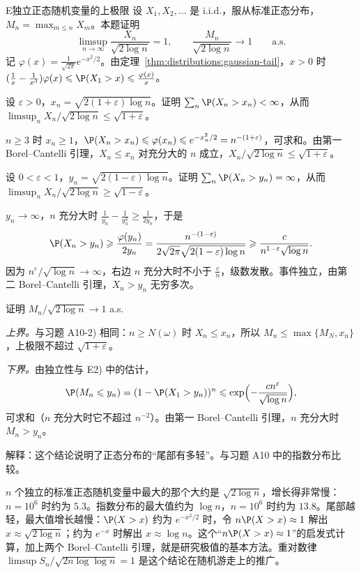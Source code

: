 \begin{probleme}{E}{独立正态随机变量的上极限}
设 $X_1,X_2,\dots$ 是 i.i.d.，服从标准正态分布，$M_n=\max_{m\leqslant n}X_m$。本题证明
\[
\limsup_{n\to\infty}\frac{X_n}{\sqrt{2\log n}}=1,\qquad\frac{M_n}{\sqrt{2\log n}}\to1\qquad\text{a.s.}
\]
记 $\varphi(x)=\frac1{\sqrt{2\pi}}e^{-x^2/2}$。由定理~\ref{thm:distributions:gaussian-tail}，$x>0$ 时 $(\frac1x-\frac1{x^3})\varphi(x)\leqslant \P(X_1>x)\leqslant\frac{\varphi(x)}x$。
\begin{questions}
\item 设 $\varepsilon>0$，$x_n=\sqrt{2(1+\varepsilon)\log n}$。证明 $\sum_n\P(X_n>x_n)<\infty$，从而 $\limsup_nX_n/\sqrt{2\log n}\leqslant\sqrt{1+\varepsilon}$。
\begin{solution}
$n\geqslant3$ 时 $x_n\geqslant1$，$\P(X_n>x_n)\leqslant\varphi(x_n)\leqslant e^{-x_n^2/2}=n^{-(1+\varepsilon)}$，可求和。由第一 Borel--Cantelli 引理，$X_n\leqslant x_n$ 对充分大的 $n$ 成立，$X_n/\sqrt{2\log n}\leqslant\sqrt{1+\varepsilon}$。
\end{solution}
\item 设 $0<\varepsilon<1$，$y_n=\sqrt{2(1-\varepsilon)\log n}$。证明 $\sum_n\P(X_n>y_n)=\infty$，从而 $\limsup_nX_n/\sqrt{2\log n}\geqslant\sqrt{1-\varepsilon}$。
\begin{solution}
$y_n\to\infty$，$n$ 充分大时 $\frac1{y_n}-\frac1{y_n^3}\geqslant\frac1{2y_n}$，于是
\[
\P(X_n>y_n)\geqslant\frac{\varphi(y_n)}{2y_n}=\frac{n^{-(1-\varepsilon)}}{2\sqrt{2\pi}\sqrt{2(1-\varepsilon)\log n}}\geqslant\frac{c}{n^{1-\varepsilon}\sqrt{\log n}} .
\]
因为 $n^{\varepsilon}/\sqrt{\log n}\to\infty$，右边 $n$ 充分大时不小于 $\frac cn$，级数发散。事件独立，由第二 Borel--Cantelli 引理，$X_n>y_n$ 无穷多次。
\end{solution}
\item 证明 $M_n/\sqrt{2\log n}\to1$ a.s.
\begin{solution}
\emph{上界。}与习题 A10-2) 相同：$n\geqslant N(\omega)$ 时 $X_n\leqslant x_n$，所以 $M_n\leqslant\max\{M_N,x_n\}$，上极限不超过 $\sqrt{1+\varepsilon}$。

\emph{下界。}由独立性与 E2) 中的估计，
\[
\P(M_n\leqslant y_n)=(1-\P(X_1>y_n))^n\leqslant\exp\Bigl(-\frac{cn^\varepsilon}{\sqrt{\log n}}\Bigr),
\]
可求和（$n$ 充分大时它不超过 $n^{-2}$）。由第一 Borel--Cantelli 引理，$n$ 充分大时 $M_n>y_n$。
\end{solution}
\item 解释：这个结论说明了正态分布的“尾部有多轻”。与习题 A10 中的指数分布比较。
\begin{solution}
$n$ 个独立的标准正态随机变量中最大的那个大约是 $\sqrt{2\log n}$，增长得非常慢：$n=10^6$ 时约为 $5.3$。指数分布的最大值约为 $\log n$，$n=10^6$ 时约为 $13.8$。尾部越轻，最大值增长越慢：$\P(X>x)$ 约为 $e^{-x^2/2}$ 时，令 $n\P(X>x)\approx1$ 解出 $x\approx\sqrt{2\log n}$；约为 $e^{-x}$ 时解出 $x\approx\log n$。这个“$n\P(X>x)\approx1$”的启发式计算，加上两个 Borel--Cantelli 引理，就是研究极值的基本方法。重对数律 $\limsup S_n/\sqrt{2n\log\log n}=1$ 是这个结论在随机游走上的推广。
\end{solution}
\end{questions}
\end{probleme}
